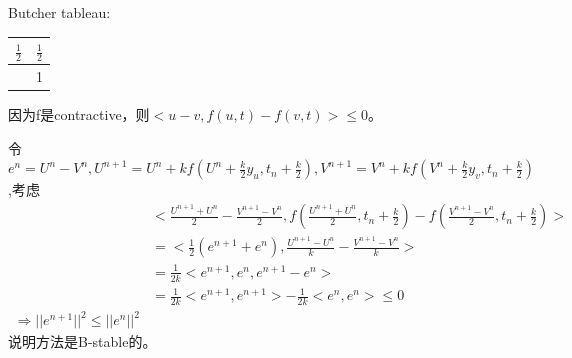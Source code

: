 \documentclass[UTF8]{ctexart}
\begin{document}
Butcher tableau:
\begin{table}[H]
    \centering
    \begin{tabular}{c|c}
        $\frac{1}{2}$ & $\frac{1}{2}$ \\
        \hline
                    & 1
    \end{tabular}
\end{table}
因为f是contractive，则$<u-v, f(u,t)-f(v,t)> \leq 0$。

令$e^n = U^n - V^n,U^{n+1} = U^n + kf(U^n + \frac{k}{2}y_u, t_n+\frac{k}{2}),
                   V^{n+1} = V^n + kf(V^n + \frac{k}{2}y_v, t_n+\frac{k}{2})$,考虑
\begin{equation}
\begin{aligned}
    & <\frac{U^{n+1}+U^n}{2} - \frac{V^{n+1}-V^n}{2}, f(\frac{U^{n+1}+U^n}{2}, t_n+\frac{k}{2}) - f(\frac{V^{n+1}-V^n}{2}, t_n+\frac{k}{2})> \\
    &= <\frac{1}{2}(e^{n+1}+e^n), \frac{U^{n+1}-U^n}{k}-\frac{V^{n+1}-V^n}{k}> \\
    &= \frac{1}{2k}<e^{n+1}, e^n, e^{n+1}-e^n> \\
    &= \frac{1}{2k}<e^{n+1}, e^{n+1}> - \frac{1}{2k}<e^n, e^n> \leq 0 \\
    \Rightarrow ||e^{n+1}||^2 \leq ||e^n||^2 
\end{aligned}
\end{equation}
说明方法是B-stable的。









\end{document}
